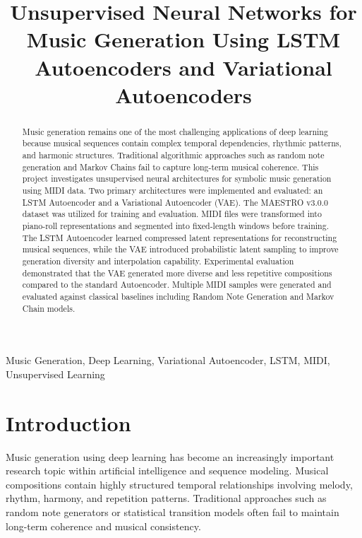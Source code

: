 \documentclass[conference]{IEEEtran}
\begin{document}
\title{Unsupervised Neural Networks for Music Generation Using LSTM Autoencoders and Variational Autoencoders}

\author{
}

\maketitle

\begin{abstract}
Music generation remains one of the most challenging applications of deep learning because musical sequences contain complex temporal dependencies, rhythmic patterns, and harmonic structures. Traditional algorithmic approaches such as random note generation and Markov Chains fail to capture long-term musical coherence. This project investigates unsupervised neural architectures for symbolic music generation using MIDI data. Two primary architectures were implemented and evaluated: an LSTM Autoencoder and a Variational Autoencoder (VAE). The MAESTRO v3.0.0 dataset was utilized for training and evaluation. MIDI files were transformed into piano-roll representations and segmented into fixed-length windows before training. The LSTM Autoencoder learned compressed latent representations for reconstructing musical sequences, while the VAE introduced probabilistic latent sampling to improve generation diversity and interpolation capability. Experimental evaluation demonstrated that the VAE generated more diverse and less repetitive compositions compared to the standard Autoencoder. Multiple MIDI samples were generated and evaluated against classical baselines including Random Note Generation and Markov Chain models.
\end{abstract}

\begin{IEEEkeywords}
Music Generation, Deep Learning, Variational Autoencoder, LSTM, MIDI, Unsupervised Learning
\end{IEEEkeywords}

\section{Introduction}
Music generation using deep learning has become an increasingly important research topic within artificial intelligence and sequence modeling. Musical compositions contain highly structured temporal relationships involving melody, rhythm, harmony, and repetition patterns. Traditional approaches such as random note generators or statistical transition models often fail to maintain long-term coherence and musical consistency.
\end{document}
